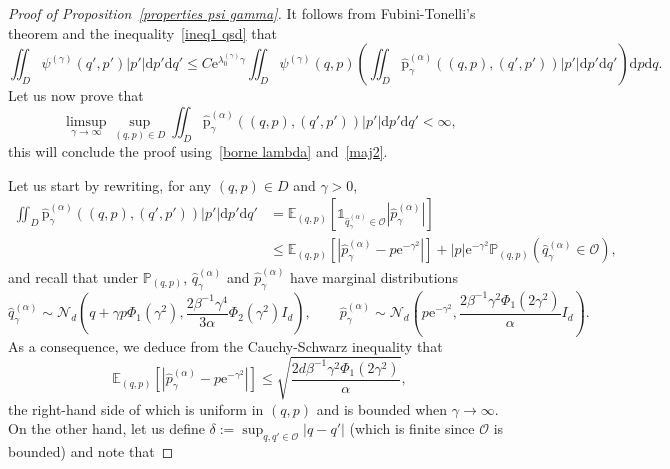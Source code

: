 \documentclass[preprint,EJP]{ejpecp}
\begin{document}
\begin{proof}[Proof of Proposition~\ref{properties psi gamma}]
It follows from Fubini-Tonelli's theorem and the inequality~\eqref{ineq1 qsd} that
\begin{equation}\label{maj2}
  \iint_{D}\psi^{(\gamma)}(q',p')\vert p'\vert \mathrm{d}p' \mathrm{d}q'\leq C \mathrm{e}^{\lambda_0^{(\gamma)}\gamma} \iint_{D}\psi^{(\gamma)}(q,p) \left(\iint_{D}\widehat{\mathrm{p}}^{(\alpha)}_{\gamma}((q,p),(q',p'))\vert p'\vert \mathrm{d}p' \mathrm{d}q'\right)\mathrm{d}p \mathrm{d}q.  
\end{equation}
Let us now prove that $$\limsup_{\gamma \to \infty} \sup_{(q,p)\in D} \iint_{D}\widehat{\mathrm{p}}^{(\alpha)}_{\gamma}((q,p),(q',p'))\vert p'\vert \mathrm{d}p' \mathrm{d}q' < \infty,$$ this will conclude the proof using~\eqref{borne lambda} and~\eqref{maj2}. 

 

Let us start by rewriting, for any $(q,p) \in D$ and $\gamma>0$,
\begin{align*}
  \iint_{D}\widehat{\mathrm{p}}^{(\alpha)}_{\gamma}((q,p),(q',p'))\vert p'\vert \mathrm{d}p' \mathrm{d}q' &= \mathbb{E}_{(q,p)}\left[\mathbb{1}_{\widehat{q}^{(\alpha)}_\gamma \in \mathcal{O}}|\widehat{p}^{(\alpha)}_\gamma|\right] \\
  &\leq \mathbb{E}_{(q,p)}\left[|\widehat{p}^{(\alpha)}_\gamma-p\mathrm{e}^{-\gamma^2}|\right] + |p|\mathrm{e}^{-\gamma^2}\mathbb{P}_{(q,p)}\left(\widehat{q}^{(\alpha)}_\gamma \in \mathcal{O}\right),
\end{align*}
and recall that under $\mathbb{P}_{(q,p)}$, $\widehat{q}^{(\alpha)}_\gamma$ and $\widehat{p}^{(\alpha)}_\gamma$ have marginal distributions
\begin{equation*}
  \widehat{q}^{(\alpha)}_\gamma \sim \mathcal{N}_d\left(q+\gamma p \Phi_1(\gamma^2), \frac{2\beta^{-1}\gamma^4}{3\alpha} \Phi_2(\gamma^2)I_d\right), \qquad \widehat{p}^{(\alpha)}_\gamma \sim \mathcal{N}_d\left(p\mathrm{e}^{-\gamma^2}, \frac{2\beta^{-1} \gamma^2 \Phi_1(2\gamma^2)}{\alpha}I_d\right).
\end{equation*}
As a consequence, we deduce from the Cauchy-Schwarz inequality that
\begin{equation*}
  \mathbb{E}_{(q,p)}\left[|\widehat{p}^{(\alpha)}_\gamma-p\mathrm{e}^{-\gamma^2}|\right] \leq \sqrt{\frac{2d\beta^{-1} \gamma^2 \Phi_1(2\gamma^2)}{\alpha}},
\end{equation*}
the right-hand side of which is uniform in $(q,p)$ and is bounded when $\gamma \to \infty$. On the other hand, let us define $\delta:=\sup_{q,q'\in\mathcal{O}}\vert q-q'\vert$ (which is finite since $\mathcal{O}$ is bounded) and note that

\end{proof}
\end{document}
